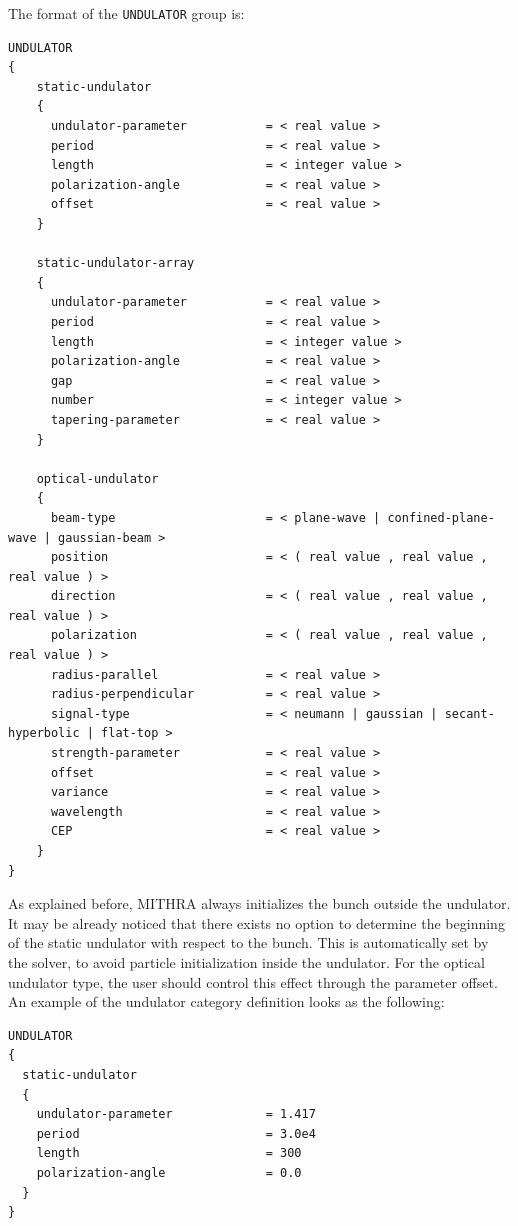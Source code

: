 The format of the \texttt{UNDULATOR} group is:
%
\begin{Verbatim}[frame=single,fontsize=\small,tabsize=4]
UNDULATOR
{
	static-undulator
	{
	  undulator-parameter           = < real value >
	  period                        = < real value >
	  length                        = < integer value >
      polarization-angle            = < real value >
      offset                        = < real value >
    }
    
    static-undulator-array
    {
      undulator-parameter           = < real value >
      period                        = < real value >
      length                        = < integer value >
      polarization-angle            = < real value >
      gap                           = < real value >
      number                        = < integer value >
      tapering-parameter            = < real value > 
    }
    
    optical-undulator
    {
      beam-type                     = < plane-wave | confined-plane-wave | gaussian-beam >
	  position                      = < ( real value , real value , real value ) >
	  direction                     = < ( real value , real value , real value ) >
	  polarization                  = < ( real value , real value , real value ) >
	  radius-parallel               = < real value >
	  radius-perpendicular          = < real value >
	  signal-type                   = < neumann | gaussian | secant-hyperbolic | flat-top >
	  strength-parameter            = < real value >
	  offset                        = < real value >
	  variance                      = < real value >
	  wavelength                    = < real value >
	  CEP                           = < real value >
	}
}
\end{Verbatim}
%
As explained before, MITHRA always initializes the bunch outside the undulator.
%
It may be already noticed that there exists no option to determine the beginning of the static undulator with respect to the bunch.
%
This is automatically set by the solver, to avoid particle initialization inside the undulator.
%
For the optical undulator type, the user should control this effect through the parameter offset.
%
An example of the undulator category definition looks as the following:
%
\begin{snugshade}
\begin{Verbatim}[fontsize=\small, tabsize = 4]
UNDULATOR
{
  static-undulator
  {
    undulator-parameter             = 1.417
    period                          = 3.0e4
    length                          = 300
    polarization-angle              = 0.0
  }
}
\end{Verbatim}
\end{snugshade}
